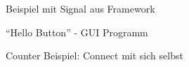 \begin{figure}[ht]
    \centering
    \caption{Beispiel mit Signal aus Framework}
\end{figure}

\begin{figure}[ht]
    \centering
    \caption{``Hello Button'' - GUI Programm}
\end{figure}

\begin{figure}[ht]
    \centering
    \caption{Counter Beispiel: Connect mit sich selbst}
\end{figure}


